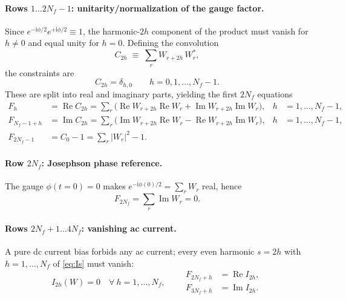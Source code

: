 \documentclass[11pt,a4paper]{article}
\newcommand{\ii}{\mathrm{i}}
\newcommand{\Real}{\operatorname{Re}}
\newcommand{\Imag}{\operatorname{Im}}
\begin{document}
\paragraph{Rows $1\ldots 2N_f-1$: unitarity/normalization of the gauge factor.}
Since $e^{-\ii\phi/2}e^{+\ii\phi/2}\equiv1$, the harmonic-$2h$ component of the
product must vanish for $h\neq0$ and equal unity for $h=0$.  Defining the
convolution
\begin{equation}
  C_{2h} \;\equiv\; \sum_{r} W_{r+2h}\,W^{*}_{r},
  \label{eq:Cdef}
\end{equation}
the constraints are
\begin{equation}
  C_{2h}=\delta_{h,0}\qquad h=0,1,\dots,N_f-1.
  \label{eq:unitarity_explicit}
\end{equation}
These are split into real and imaginary parts, yielding the first $2N_f$ equations
\begin{align}
  F_{h}        &= \Real C_{2h} = \sum_r\big(\Real W_{r+2h}\Real W_r+\Imag W_{r+2h}\Imag W_r\big),
                 & h&=1,\dots,N_f-1, \label{eq:F_reC}\\
  F_{N_f-1+h}  &= \Imag C_{2h} = \sum_r\big(\Imag W_{r+2h}\Real W_r-\Real W_{r+2h}\Imag W_r\big),
                 & h&=1,\dots,N_f-1, \label{eq:F_imC}\\
  F_{2N_f-1}   &= C_0-1 = \sum_r|W_r|^2-1. \label{eq:F_norm}
\end{align}

\paragraph{Row $2N_f$: Josephson phase reference.}
The gauge $\phi(t{=}0)=0$ makes $e^{-\ii\phi(0)/2}=\sum_r W_r$ real, hence
\begin{equation}
  F_{2N_f} = \sum_r \Imag W_r = 0.
  \label{eq:F_gauge}
\end{equation}

\paragraph{Rows $2N_f+1\ldots 4N_f$: vanishing ac current.}
A pure dc current bias forbids any ac current; every even harmonic $s=2h$ with
$h=1,\dots,N_f$ of \eqref{eq:Is} must vanish:
\begin{equation}
  I_{2h}(W)=0\quad \forall\ h=1,\dots,N_f,
  \qquad
  \begin{aligned}
    F_{2N_f+h} &= \Real I_{2h},\\
    F_{3N_f+h} &= \Imag I_{2h}.
  \end{aligned}
  \label{eq:F_current}
\end{equation}
\end{document}
